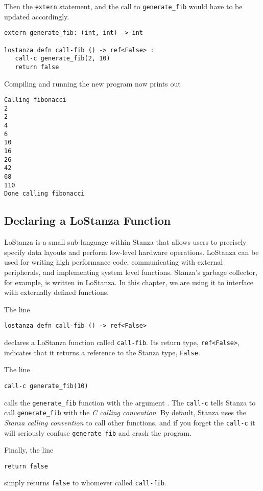 \documentclass[10pt,oneside]{book}
\begin{document}
Then the \texttt{\frenchspacing extern} statement, and the call to \texttt{\frenchspacing generate\_fib} would have to be updated accordingly.
\begin{lstlisting}
extern generate_fib: (int, int) -> int

lostanza defn call-fib () -> ref<False> :
   call-c generate_fib(2, 10)
   return false
\end{lstlisting}
Compiling and running the new program now prints out
\begin{lstlisting}
Calling fibonacci
2
2
4
6
10
16
26
42
68
110
Done calling fibonacci
\end{lstlisting}

\subsection*{Declaring a LoStanza Function}
LoStanza is a small sub-language within Stanza that allows users to precisely specify data layouts and perform low-level hardware operations. LoStanza can be used for writing high performance code, communicating with external peripherals, and implementing system level functions. Stanza's garbage collector, for example, is written in LoStanza. In this chapter, we are using it to interface with externally defined functions. 

The line
\begin{lstlisting}
lostanza defn call-fib () -> ref<False>
\end{lstlisting}
declares a LoStanza function called \texttt{\frenchspacing call-fib}. Its return type, \texttt{\frenchspacing ref<False>}, indicates that it returns a reference to the Stanza type, \texttt{\frenchspacing False}. 

The line
\begin{lstlisting}
call-c generate_fib(10)
\end{lstlisting}
calls the \texttt{\frenchspacing generate\_fib} function with the argument \texttt{}. The \texttt{\frenchspacing call-c} tells Stanza to call \texttt{\frenchspacing generate\_fib} with the {\em C calling convention}. By default, Stanza uses the {\em Stanza calling convention} to call other functions, and if you forget the \texttt{\frenchspacing call-c} it will seriously confuse \texttt{\frenchspacing generate\_fib} and crash the program. 

Finally, the line
\begin{lstlisting}
return false
\end{lstlisting}
simply returns \texttt{\frenchspacing false} to whomever called \texttt{\frenchspacing call-fib}.
\end{document}
